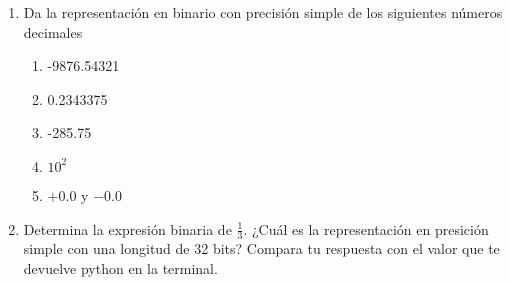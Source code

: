\documentclass[11pt]{article}
\begin{document}
\begin{enumerate}
\begin{enumerate}
\item {}
\item {}
\item {}
\item {}
\item {}
\item {}
\item {}
\item {}
\end{enumerate}
\item Da la representaci\'{o}n en binario con precisi\'{o}n simple de los siguientes n\'{u}meros decimales
\begin{enumerate}
\item -9876.54321
\item 0.2343375
\item -285.75
\item $10^{2}$
\item $+0.0$ y $-0.0$
\end{enumerate}
\item Determina la expresi\'{o}n binaria de $\frac{1}{3}$. ¿Cu\'{a}l es la representaci\'{o}n en presici\'{o}n simple con una longitud de 32 bits? Compara tu respuesta con el valor que te devuelve python en la terminal.
\end{enumerate}
\end{document}
